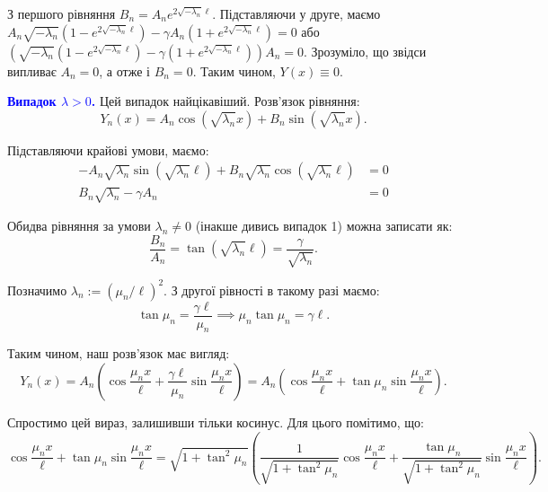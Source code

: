 \documentclass{hw_template}
\begin{document}
З першого рівняння $B_n=A_ne^{2\sqrt{-\lambda_n}\ell}$. Підставляючи у друге,
маємо $A_n\sqrt{-\lambda_n}(1 - e^{2\sqrt{-\lambda_n}\ell}) - \gamma
A_n(1+e^{2\sqrt{-\lambda_n}\ell})=0$ або $\left(\sqrt{-\lambda_n}(1 -
e^{2\sqrt{-\lambda_n}\ell}) - \gamma (1+e^{2\sqrt{-\lambda_n}\ell})\right)A_n=0$.
Зрозуміло, що звідси випливає $A_n=0$, а отже і $B_n=0$. Таким чином, $Y(x) \equiv
0$.

\textcolor{blue}{\textbf{Випадок $\lambda > 0$.}} Цей випадок найцікавіший. 
Розв'язок рівняння:
\begin{equation*}
    Y_n(x) = A_n\cos(\sqrt{\lambda_n}x) + B_n\sin(\sqrt{\lambda_n}x).
\end{equation*}

Підставляючи крайові умови, маємо:
\begin{align*}
    -A_n\sqrt{\lambda_n}\sin(\sqrt{\lambda_n}\ell) + B_n\sqrt{\lambda_n}\cos(\sqrt{\lambda_n}\ell) &= 0 \\
    B_n\sqrt{\lambda_n} - \gamma A_n &= 0
\end{align*}

Обидва рівняння за умови $\lambda_n \neq 0$ (інакше дивись випадок 1) можна записати як:
\begin{equation*}
    \frac{B_n}{A_n} = \tan(\sqrt{\lambda_n}\ell) = \frac{\gamma}{\sqrt{\lambda_n}}.
\end{equation*}

Позначимо $\lambda_n := (\mu_n/\ell)^2$. З другої рівності в такому разі маємо:
\begin{equation*}
    \tan \mu_n = \frac{\gamma \ell}{\mu_n} \implies \mu_n \tan \mu_n = \gamma\ell.
\end{equation*}

Таким чином, наш розв'язок має вигляд:
\begin{equation*}
    Y_n(x) = A_n\left(\cos \frac{\mu_n x}{\ell} + \frac{\gamma \ell}{\mu_n}\sin \frac{\mu_n x}{\ell}\right) = A_n\left(\cos \frac{\mu_n x}{\ell} + \tan \mu_n\sin \frac{\mu_n x}{\ell}\right).
\end{equation*}

Спростимо цей вираз, залишивши тільки косинус. Для цього помітимо, що:
\begin{equation*}
    \cos \frac{\mu_n x}{\ell} + \tan \mu_n\sin \frac{\mu_n x}{\ell} = \sqrt{1+\tan^2\mu_n}\left(\frac{1}{\sqrt{1+\tan^2\mu_n}}\cos \frac{\mu_n x}{\ell} + \frac{\tan\mu_n}{\sqrt{1+\tan^2\mu_n}}\sin \frac{\mu_n x}{\ell}\right).
\end{equation*}
\end{document}
